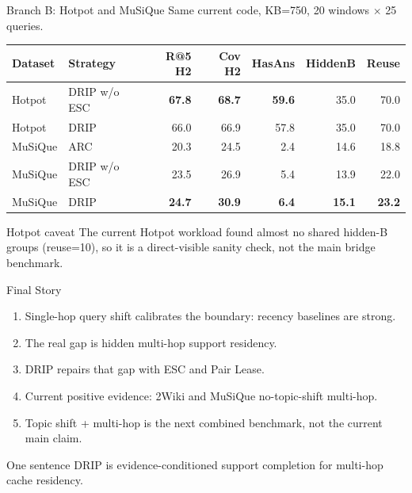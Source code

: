 \documentclass[aspectratio=169,10pt]{beamer}
\begin{document}
\begin{frame}{Branch B: Hotpot and MuSiQue}
  \small
  Same current code, KB=750, 20 windows $\times$ 25 queries.

  \begin{table}
  \centering
  \begin{tabular}{llrrrrr}
    \toprule
    Dataset & Strategy & R@5 H2 & Cov H2 & HasAns & HiddenB & Reuse \\
    \midrule
    Hotpot & DRIP w/o ESC & \textbf{67.8} & \textbf{68.7} & \textbf{59.6} & 35.0 & 70.0 \\
    Hotpot & DRIP & 66.0 & 66.9 & 57.8 & 35.0 & 70.0 \\
    \midrule
    MuSiQue & ARC & 20.3 & 24.5 & 2.4 & 14.6 & 18.8 \\
    MuSiQue & DRIP w/o ESC & 23.5 & 26.9 & 5.4 & 13.9 & 22.0 \\
    MuSiQue & DRIP & \textbf{24.7} & \textbf{30.9} & \textbf{6.4} & \textbf{15.1} & \textbf{23.2} \\
    \bottomrule
  \end{tabular}
  \end{table}

  \begin{alertblock}{Hotpot caveat}
    The current Hotpot workload found almost no shared hidden-B groups
    (reuse=10), so it is a direct-visible sanity check, not the main bridge benchmark.
  \end{alertblock}
\end{frame}

\begin{frame}{Final Story}
  \begin{enumerate}
    \item Single-hop query shift calibrates the boundary: recency baselines are strong.
    \item The real gap is hidden multi-hop support residency.
    \item DRIP repairs that gap with ESC and Pair Lease.
    \item Current positive evidence: 2Wiki and MuSiQue no-topic-shift multi-hop.
    \item Topic shift + multi-hop is the next combined benchmark, not the current main claim.
  \end{enumerate}

  \begin{block}{One sentence}
    DRIP is evidence-conditioned support completion for multi-hop cache residency.
  \end{block}
\end{frame}
\end{document}
